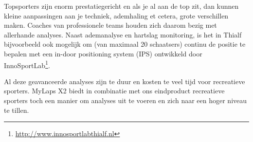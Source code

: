 Topsporters zijn enorm prestatiegericht en als je al aan de top zit, dan kunnen kleine aanpassingen aan je techniek, ademhaling et cetera, grote verschillen maken. Coaches van professionele teams houden zich daarom bezig met allerhande analyses. Naast ademanalyse en hartslag monitoring, is het in Thialf bijvoorbeeld ook mogelijk om (van maximaal 20 schaatsers) continu de positie te bepalen met een in-door positioning system (IPS) ontwikkeld door InnoSportLab\footnote{\url{http://www.innosportlabthialf.nl}}.

Al deze geavanceerde analyses zijn te duur en kosten te veel tijd voor recreatieve sporters. MyLaps X2 biedt in combinatie met ons eindproduct recreatieve sporters toch een manier om analyses uit te voeren en zich naar een hoger niveau te tillen.